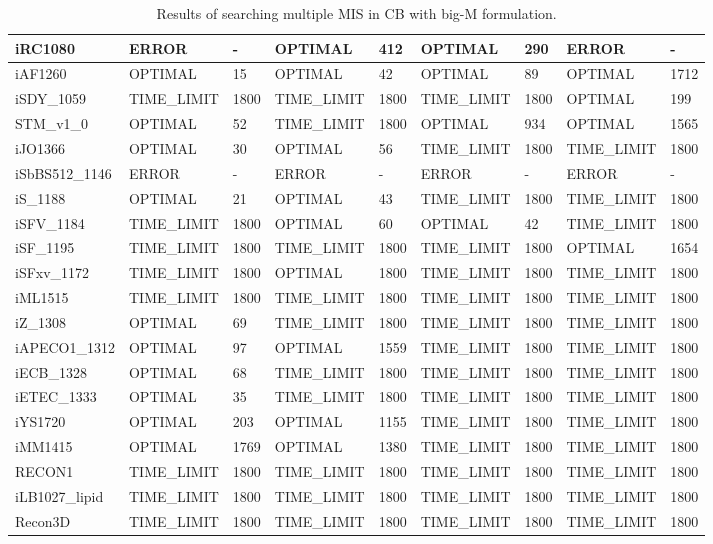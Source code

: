 \begin{table}[!ht]
\begin{tabular}{|l|l|l|l|l|l|l|l|l|}
        iRC1080 & ERROR & - & OPTIMAL & 412 & OPTIMAL & 290 & ERROR & - \\ \hline
        iAF1260 & OPTIMAL & 15 & OPTIMAL & 42 & OPTIMAL & 89 & OPTIMAL & 1712 \\ \hline
        iSDY\_1059 & TIME\_LIMIT & 1800 & TIME\_LIMIT & 1800 & TIME\_LIMIT & 1800 & OPTIMAL & 199 \\ \hline
        STM\_v1\_0 & OPTIMAL & 52 & TIME\_LIMIT & 1800 & OPTIMAL & 934 & OPTIMAL & 1565 \\ \hline
        iJO1366 & OPTIMAL & 30 & OPTIMAL & 56 & TIME\_LIMIT & 1800 & TIME\_LIMIT & 1800 \\ \hline
        iSbBS512\_1146 & ERROR & - & ERROR & - & ERROR & - & ERROR & - \\ \hline
        iS\_1188 & OPTIMAL & 21 & OPTIMAL & 43 & TIME\_LIMIT & 1800 & TIME\_LIMIT & 1800 \\ \hline
        iSFV\_1184 & TIME\_LIMIT & 1800 & OPTIMAL & 60 & OPTIMAL & 42 & TIME\_LIMIT & 1800 \\ \hline
        iSF\_1195 & TIME\_LIMIT & 1800 & TIME\_LIMIT & 1800 & TIME\_LIMIT & 1800 & OPTIMAL & 1654 \\ \hline
        iSFxv\_1172 & TIME\_LIMIT & 1800 & OPTIMAL & 1800 & TIME\_LIMIT & 1800 & TIME\_LIMIT & 1800 \\ \hline
        iML1515 & TIME\_LIMIT & 1800 & TIME\_LIMIT & 1800 & TIME\_LIMIT & 1800 & TIME\_LIMIT & 1800 \\ \hline
        iZ\_1308 & OPTIMAL & 69 & TIME\_LIMIT & 1800 & TIME\_LIMIT & 1800 & TIME\_LIMIT & 1800 \\ \hline
        iAPECO1\_1312 & OPTIMAL & 97 & OPTIMAL & 1559 & TIME\_LIMIT & 1800 & TIME\_LIMIT & 1800 \\ \hline
        iECB\_1328 & OPTIMAL & 68 & TIME\_LIMIT & 1800 & TIME\_LIMIT & 1800 & TIME\_LIMIT & 1800 \\ \hline
        iETEC\_1333 & OPTIMAL & 35 & TIME\_LIMIT & 1800 & TIME\_LIMIT & 1800 & TIME\_LIMIT & 1800 \\ \hline
        iYS1720 & OPTIMAL & 203 & OPTIMAL & 1155 & TIME\_LIMIT & 1800 & TIME\_LIMIT & 1800 \\ \hline
        iMM1415 & OPTIMAL & 1769 & OPTIMAL & 1380 & TIME\_LIMIT & 1800 & TIME\_LIMIT & 1800 \\ \hline
        RECON1 & TIME\_LIMIT & 1800 & TIME\_LIMIT & 1800 & TIME\_LIMIT & 1800 & TIME\_LIMIT & 1800 \\ \hline
        iLB1027\_lipid & TIME\_LIMIT & 1800 & TIME\_LIMIT & 1800 & TIME\_LIMIT & 1800 & TIME\_LIMIT & 1800 \\ \hline
        Recon3D & TIME\_LIMIT & 1800 & TIME\_LIMIT & 1800 & TIME\_LIMIT & 1800 & TIME\_LIMIT & 1800 \\ \hline
    \end{tabular}
    \caption{\label{Tab:multiple_mis_big_m} Results of searching multiple MIS in CB with big-M formulation.}
\end{table}

